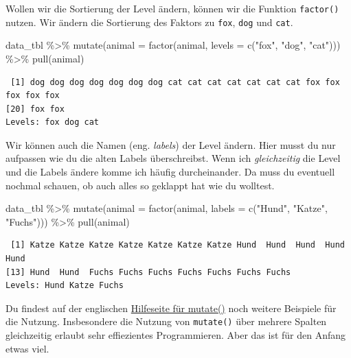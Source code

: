 \documentclass[
  letterpaper,
]{scrbook}
\newenvironment{Shaded}{\begin{snugshade}}{\end{snugshade}}
\newcommand{\AttributeTok}[1]{\textcolor[rgb]{0.40,0.45,0.13}{#1}}
\newcommand{\FunctionTok}[1]{\textcolor[rgb]{0.28,0.35,0.67}{#1}}
\newcommand{\NormalTok}[1]{\textcolor[rgb]{0.00,0.23,0.31}{#1}}
\newcommand{\SpecialCharTok}[1]{\textcolor[rgb]{0.37,0.37,0.37}{#1}}
\newcommand{\StringTok}[1]{\textcolor[rgb]{0.13,0.47,0.30}{#1}}
\begin{document}
Wollen wir die Sortierung der Level ändern, können wir die Funktion
\texttt{factor()} nutzen. Wir ändern die Sortierung des Faktors zu
\texttt{fox}, \texttt{dog} und \texttt{cat}.

\begin{Shaded}
\begin{Highlighting}[]
\NormalTok{data\_tbl }\SpecialCharTok{\%\textgreater{}\%} 
  \FunctionTok{mutate}\NormalTok{(}\AttributeTok{animal =} \FunctionTok{factor}\NormalTok{(animal, }\AttributeTok{levels =} \FunctionTok{c}\NormalTok{(}\StringTok{"fox"}\NormalTok{, }\StringTok{"dog"}\NormalTok{, }\StringTok{"cat"}\NormalTok{))) }\SpecialCharTok{\%\textgreater{}\%} 
  \FunctionTok{pull}\NormalTok{(animal)}
\end{Highlighting}
\end{Shaded}

\begin{verbatim}
 [1] dog dog dog dog dog dog dog cat cat cat cat cat cat cat fox fox fox fox fox
[20] fox fox
Levels: fox dog cat
\end{verbatim}

Wir können auch die Namen (eng. \emph{labels}) der Level ändern. Hier
musst du nur aufpassen wie du die alten Labels überschreibst. Wenn ich
\emph{gleichzeitig} die Level und die Labels ändere komme ich häufig
durcheinander. Da muss du eventuell nochmal schauen, ob auch alles so
geklappt hat wie du wolltest.

\begin{Shaded}
\begin{Highlighting}[]
\NormalTok{data\_tbl }\SpecialCharTok{\%\textgreater{}\%} 
  \FunctionTok{mutate}\NormalTok{(}\AttributeTok{animal =} \FunctionTok{factor}\NormalTok{(animal, }\AttributeTok{labels =} \FunctionTok{c}\NormalTok{(}\StringTok{"Hund"}\NormalTok{, }\StringTok{"Katze"}\NormalTok{, }\StringTok{"Fuchs"}\NormalTok{))) }\SpecialCharTok{\%\textgreater{}\%} 
  \FunctionTok{pull}\NormalTok{(animal)}
\end{Highlighting}
\end{Shaded}

\begin{verbatim}
 [1] Katze Katze Katze Katze Katze Katze Katze Hund  Hund  Hund  Hund  Hund 
[13] Hund  Hund  Fuchs Fuchs Fuchs Fuchs Fuchs Fuchs Fuchs
Levels: Hund Katze Fuchs
\end{verbatim}

Du findest auf der englischen
\href{https://dplyr.tidyverse.org/reference/mutate.html}{Hilfeseite für
mutate()} noch weitere Beispiele für die Nutzung. Insbesondere die
Nutzung von \texttt{mutate()} über mehrere Spalten gleichzeitig erlaubt
sehr effiezientes Programmieren. Aber das ist für den Anfang etwas viel.
\end{document}
